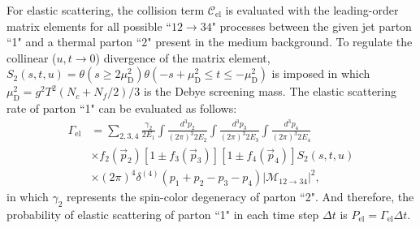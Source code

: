 \documentclass[aps,prc,twocolumn,floatfix,superscriptaddress,nofootinbib]{revtex4}
\begin{document}
For elastic scattering, the collision term $\mathcal{C}_\mathrm{el}$ is evaluated with the leading-order matrix elements for all possible ``$12\rightarrow34$" processes between the given jet parton ``1" and a thermal parton ``2" present in the medium background. To regulate the collinear  ($u,t\rightarrow 0$) divergence of the matrix element, $S_2(s,t,u)=\theta(s\ge2\mu_\mathrm{D}^2)\theta(-s+\mu_\mathrm{D}^2\le t\le -\mu_\mathrm{D}^2)$ is imposed in which $\mu_\mathrm{D}^2=g^2T^2(N_c+N_f/2)/3$ is the Debye screening mass. The elastic scattering rate of parton ``1" can be evaluated as follows:
\begin{align}
 \label{eq:rate2}
 \Gamma_\mathrm{el}&=\sum_{2,3,4}\frac{\gamma_2}{2E_1}\int \frac{d^3 p_2}{(2\pi)^3 2E_2}\int\frac{d^3 p_3}{(2\pi)^3 2E_3}\int\frac{d^3 p_4}{(2\pi)^3 2E_4}\nonumber\\
&\times f_2(\vec{p}_2)\left[1\pm f_3(\vec{p}_3) \right]\left[1\pm f_4(\vec{p}_4)\right] S_2(s,t,u)\nonumber\\
&\times (2\pi)^4\delta^{(4)}(p_1+p_2-p_3-p_4)|\mathcal{M_\mathrm{12\rightarrow34}}|^2,
\end{align}
in which $\gamma_2$ represents the spin-color degeneracy of parton ``2". And therefore, the probability of elastic scattering of parton ``1" in each time step $\Delta t$ is $P_\mathrm{el}=\Gamma_\mathrm{el}\Delta t$. 
\end{document}
